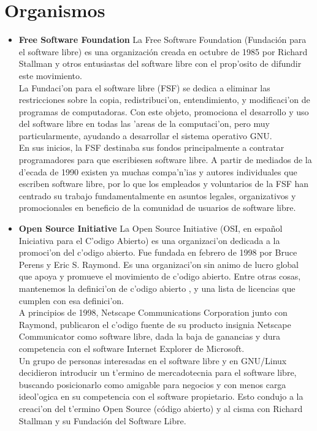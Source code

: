 \documentclass{book}
\begin{document}
\section{Organismos}
\begin{itemize}
     	\item {\bf Free Software Foundation }
La Free Software Foundation (Fundación para el software libre) es una organización creada en octubre de 1985 por Richard Stallman y otros entusiastas del software libre con el prop'osito de difundir este movimiento.\\La Fundaci'on para el software libre (FSF) se dedica a eliminar las restricciones sobre la copia, redistribuci'on, entendimiento, y modificaci'on de programas de computadoras. Con este objeto, promociona el desarrollo y uso del software libre en todas las 'areas de la computaci'on, pero muy particularmente, ayudando a desarrollar el sistema operativo GNU.\\En sus inicios, la FSF destinaba sus fondos principalmente a contratar programadores para que escribiesen software libre. A partir de mediados de la d'ecada de 1990 existen ya muchas compa'n'ias y autores individuales que escriben software libre, por lo que los empleados y voluntarios de la FSF han centrado su trabajo fundamentalmente en asuntos legales, organizativos y promocionales en beneficio de la comunidad de usuarios de software libre.
	\item {\bf Open Source Initiative}
La Open Source Initiative (OSI, en español Iniciativa para el C'odigo Abierto) es una organizaci'on dedicada a la promoci'on del c'odigo abierto. Fue fundada en febrero de 1998 por Bruce Perens y Eric S. Raymond. Es una organizaci'on sin animo de lucro global que apoya y promueve el movimiento de c'odigo abierto. Entre otras cosas, mantenemos la definici'on de c'odigo abierto , y una lista de licencias que cumplen con esa definici'on.\\A principios de 1998, Netscape Communications Corporation junto con Raymond, publicaron el c'odigo fuente de su producto insignia Netscape Communicator como software libre, dada la baja de ganancias y dura competencia con el software Internet Explorer de Microsoft.\\Un grupo de personas interesadas en el software libre y en GNU/Linux decidieron introducir un t'ermino de mercadotecnia para el software libre, buscando posicionarlo como amigable para negocios y con menos carga ideol'ogica en su competencia con el software propietario. Esto condujo a la creaci'on del t'ermino Open Source (código abierto) y al cisma con Richard Stallman y su Fundación del Software Libre.

\end{itemize}
\end{document}
